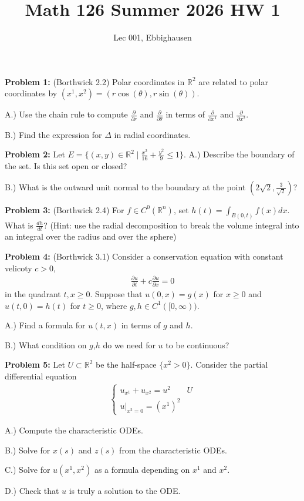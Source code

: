 \documentclass{article}
\title{Math 126 Summer 2026 HW 1}
\author{Lec 001, Ebbighausen}
\newcommand{\R}{{\mathbb{R}}}
\newcommand{\pd}{\partial}
\begin{document}
	\pagestyle{fancy}
	\fancyfoot{} 
	
	\maketitle
	
	\textbf{Problem 1:} (Borthwick 2.2) Polar coordinates in $\R^{2}$ are related to polar coordinates by $(x^1,x^2) = (r\cos(\theta),r\sin(\theta))$. 
	
	A.) Use the chain rule to compute $\frac{\pd}{\pd r}$ and $\frac{\pd}{\pd \theta}$ in terms of $\frac{\pd}{\pd x^1}$ and $\frac{\pd}{\pd x^{2}}$. 
	
	B.) Find the expression for $\Delta$ in radial coordinates. 
	
	
	\textbf{Problem 2:} Let $E = \{(x,y) \in \R^{2} \mid \frac{x^{2}}{16} + \frac{y^{2}}{9} \leq 1\}$. 
	A.) Describe the boundary of the set. Is this set open or closed? 
	
	B.) What is the outward unit normal to the boundary at the point $(2\sqrt{2}, \frac{3}{\sqrt{2}})$? 
		
	
	\textbf{Problem 3:} (Borthwick 2.4) For $f \in C^{0}(\R^{n})$, set $h(t) = \int_{B(0,t)} f(x) dx$. What is $\frac{dh}{dt}$? (Hint: use the radial decomposition to break the volume integral into an integral over the radius and over the sphere)
	
	
	\textbf{Problem 4:} (Borthwick 3.1) Consider a conservation equation with constant velicoty $c > 0$,
	\begin{align*}
		\frac{\pd u}{\pd t} + c \frac{\pd u}{ \pd x} = 0
	\end{align*}
	in the quadrant $t,x \geq 0$. Suppose that $u(0,x) = g(x)$ for $x \geq 0$ and $u(t,0) = h(t)$ for $t \geq 0$, where $g,h \in C^{1}([0,\infty))$. 
	
	A.) Find a formula for $u(t,x)$ in terms of $g$ and $h$. 
	
	B.) What condition on $g$,$h$ do we need for $u$ to be continuous?
	
	
	\textbf{Problem 5:} Let $U \subset \R^{2}$ be the half-space $\{x^{2} > 0\}$. Consider the partial differential equation
	\begin{align*}
		\begin{cases}
			u_{x^{1}} + u_{x^{2}} = u^{2} & U \\
			u|_{x^{2} = 0} = (x^{1})^{2}
		\end{cases}
	\end{align*}
	
	
	A.) Compute the characteristic ODEs.
	
	B.) Solve for $x(s)$ and $z(s)$ from the characteristic ODEs.
	
	C.) Solve for $u(x^1,x^2)$ as a formula depending on $x^{1}$ and $x^{2}$.
	
	D.) Check that $u$ is truly a solution to the ODE. 
\end{document}
